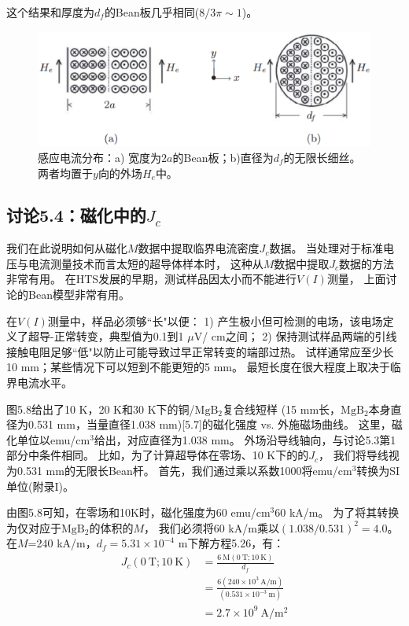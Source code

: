 这个结果和厚度为$d_f$的Bean板几乎相同($8/3\pi \sim 1$)。

\begin{figure}[htbp]
	\centering
	\includegraphics[scale=0.6]{chpt5/figs/fig5.16.eps}
	\caption{感应电流分布：a) 宽度为$2a$的Bean板；b)直径为$d_f$的无限长细丝。两者均置于$y$向的外场$H_e$中。}
\end{figure}

\subsection{讨论5.4：磁化中的$J_c$}
我们在此说明如何从​​磁化$M$数据中提取临界电流密度$J_c$数据。
当处理对于标准电压与电流测量技术而言太短的超导体样本时，
这种从$M$数据中提取$J_c$数据的方法非常有用。
在HTS发展的早期，测试样品因太小而不能进行$V(I)$测量，
上面讨论的Bean模型非常有用。

在$V(I)$测量中，样品必须够``长"以便：
1) 产生极小但可检测的电场，该电场定义了超导-正常转变，典型值为0.1到1 $\mu$V/ cm之间；
2) 保持测试样品两端的引线接触电阻足够``低"以防止可能导致过早正常转变的端部过热。
试样通常应至少长10 mm；某些情况下可以短到不能更短的5 mm。
最短长度在很大程度上取决于临界电流水平。

图5.8给出了10 K，20 K和30 K下的铜/$\mathrm{MgB_2}$复合线短样
(15 mm长，$\mathrm{MgB_2}$本身直径为0.531 mm，当量直径1.038 mm)[5.7]的磁化强度 vs. 外施磁场曲线。
这里，磁化单位以emu/$\mathrm{cm^3}$给出，对应直径为1.038 mm。
外场沿导线轴向，与讨论5.3第1部分中条件相同。
比如，为了计算超导体在零场、10 K下的的$J_c$，
我们将导线视为0.531 mm的无限长Bean杆。
首先，我们通过乘以系数1000将emu/$\mathrm{cm^3}$转换为SI单位(附录I)。

由图5.8可知，在零场和10K时，磁化强度为60 emu/$\mathrm{cm^3}$60 kA/m。
为了将其转换为仅对应于$\mathrm{MgB_2}$的体积的$M$，
我们必须将60 kA/m乘以$(1.038/0.531)^2 = 4.0$。
在$M$=240 kA/m，$d_f = 5.31\times10^{-4}$ m下解方程5.26，有：
\begin{align*}%
J_{c}(0\ \mathrm{T};10\ \mathrm{K})&=\frac{6\ \mathrm{M}(0\ \mathrm{T};10\ \mathrm{K})}{d_{f}}\\
&=\frac{6(240\times10^{3}\ \mathrm{A/m})}{(0.531\times10^{-3}\ \mathrm{m})}\\
&=2.7\times10^{9}\ \mathrm{A/m^{2}}
\end{align*}


